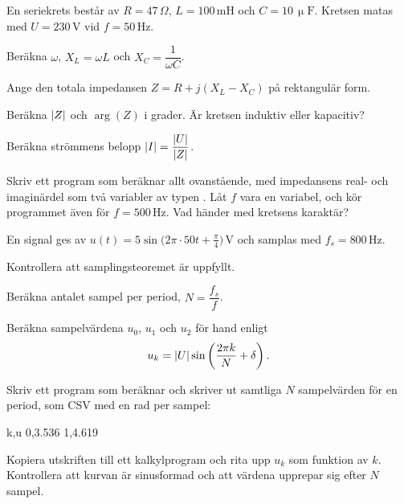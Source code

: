 En seriekrets består av $R = 47\,\Omega$, $L = 100\,\text{mH}$ och $C = 10\,\upmu\text{F}$.
Kretsen matas med $U = 230\,\text{V}$ vid $f = 50\,\text{Hz}$.
\begin{parts}
  \item Beräkna $\omega$, $X_L = \omega L$ och $X_C = \dfrac{1}{\omega C}$.
  \item Ange den totala impedansen $Z = R + j(X_L - X_C)$ på rektangulär form.
  \item Beräkna $\lvert Z\rvert$ och $\arg(Z)$ i grader. Är kretsen induktiv eller kapacitiv?
  \item Beräkna strömmens belopp $\lvert I\rvert = \dfrac{\lvert U\rvert}{\lvert Z\rvert}$.
  \item Skriv ett program som beräknar allt ovanstående, med impedansens real- och imaginärdel
    som två variabler av typen . Låt $f$ vara en variabel, och kör programmet även för $f = 500\,\text{Hz}$. Vad händer med kretsens karaktär?
\end{parts}


En signal ges av $u(t) = 5\sin\bigl(2\pi \cdot 50t + \frac{\pi}{4}\bigr)\,\text{V}$ och samplas
med $f_s = 800\,\text{Hz}$.
\begin{parts}
  \item Kontrollera att samplingsteoremet är uppfyllt.
  \item Beräkna antalet sampel per period, $N = \dfrac{f_s}{f}$.
  \item Beräkna sampelvärdena $u_0$, $u_1$ och $u_2$ för hand enligt
    \[
      u_k = \lvert U\rvert \sin\left(\frac{2\pi k}{N} + \delta\right).
    \]
  \item Skriv ett program som beräknar och skriver ut samtliga $N$ sampelvärden för en period,
    som CSV med en rad per sampel:
\begin{console}
k,u
0,3.536
1,4.619
\end{console}
  \item Kopiera utskriften till ett kalkylprogram och rita upp $u_k$ som funktion av $k$.
    Kontrollera att kurvan är sinusformad och att värdena upprepar sig efter $N$ sampel.
\end{parts}

